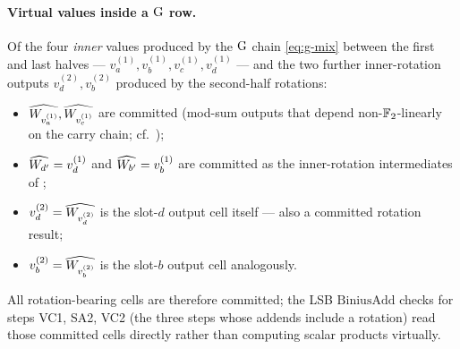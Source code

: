 \paragraph{Virtual values inside a $\operatorname{G}$ row.}
Of the four \emph{inner} values produced by the $\operatorname{G}$ chain
\eqref{eq:g-mix} between the first and last halves —
$v_a^{(1)}, v_b^{(1)}, v_c^{(1)}, v_d^{(1)}$ — and the two further
inner-rotation outputs $v_d^{(2)}, v_b^{(2)}$ produced by the
second-half rotations:
\begin{itemize}[leftmargin=2em,topsep=2pt]
\item $\widehat{W_{v_a^{(1)}}}, \widehat{W_{v_c^{(1)}}}$ are committed
      (mod-sum outputs that depend non-$\mathbb{F}_2$-linearly on the carry
      chain; cf.\ );
\item $\widehat{W_{d'}} = v_d^{(1)}$ and $\widehat{W_{b'}} = v_b^{(1)}$ are
      committed as the inner-rotation intermediates of
      ;
\item $v_d^{(2)} = \widehat{W_{v_d^{(2)}}}$ is the slot-$d$ output cell
      itself — also a committed rotation result;
\item $v_b^{(2)} = \widehat{W_{v_b^{(2)}}}$ is the slot-$b$ output cell
      analogously.
\end{itemize}
All rotation-bearing cells are therefore committed; the LSB
$\mathrm{BiniusAdd}$ checks for steps VC1, SA2, VC2 (the three steps
whose addends include a rotation) read those committed cells
directly rather than computing scalar products virtually.

